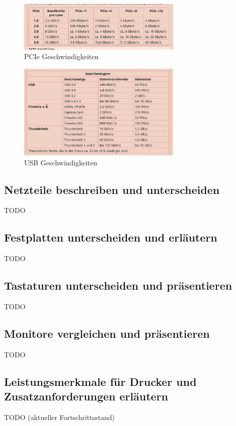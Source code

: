     \begin{figure}[ht]
        \centering
        \includegraphics[width=0.7\textwidth]{./images/2.4.5_pciespeeds.png}
        \caption{PCIe Geschwindigkeiten}\label{fig:PCIe Geschwindigkeiten}
    \end{figure}

    \begin{figure}[ht]
        \centering
        \includegraphics[width=0.7\textwidth]{./images/2.4.5_usbspeed.png}
        \caption{USB Geschwindigkeiten}\label{fig:USB Geschwindigkeiten}
    \end{figure}

\newpage
\subsection{Netzteile beschreiben und unterscheiden}
    TODO
\subsection{Festplatten unterscheiden und erläutern}
    TODO
\subsection{Tastaturen unterscheiden und präsentieren}
    TODO
\subsection{Monitore vergleichen und präsentieren}
    TODO
\subsection{Leistungsmerkmale für Drucker und Zusatzanforderungen erläutern}
    TODO (aktueller Fortschrittsstand)
